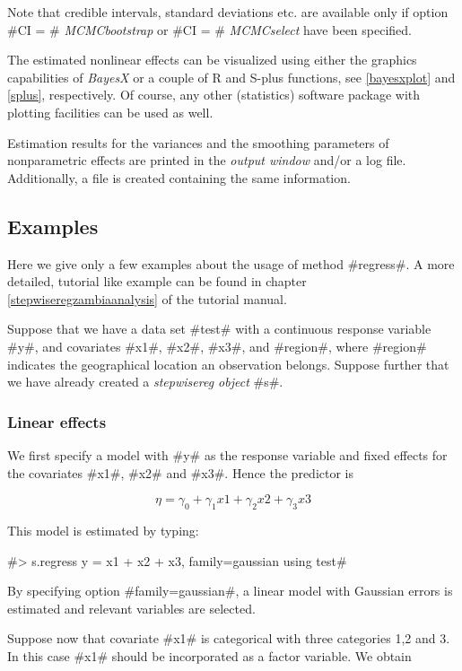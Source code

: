 Note that credible intervals, standard deviations etc. are available only
if option #CI = # {\em MCMCbootstrap} or
#CI = # {\em MCMCselect} have been specified.

The estimated nonlinear effects can be visualized using either the
graphics capabilities of {\em BayesX} or a couple of R and S-plus
functions,  see \autoref{bayesxplot} and \autoref{splus},
respectively. Of course, any other (statistics) software package
with plotting facilities can be used as well.

Estimation results for the variances and the smoothing parameters
of nonparametric effects are printed in the {\em output window}
and/or a log file. Additionally, a file is created containing the
same information.


\subsection{Examples}

Here we give only a few examples about the usage of method
#regress#. A more detailed, tutorial like example can be found in
chapter \ref*{stepwiseregzambiaanalysis} of the tutorial manual.

Suppose that we have a data set #test# with a continuous response
variable #y#, and covariates #x1#, #x2#, #x3#, and #region#,
where #region# indicates the geographical location an observation belongs. Suppose further that we have already created a
{\em stepwisereg object} #s#.

\subsubsection*{Linear effects}

We first specify a model with #y# as the response variable and
fixed effects for the covariates #x1#, #x2# and #x3#. Hence the
predictor is

$$
\eta = \gamma_0 + \gamma_1 x1 + \gamma_2 x2 + \gamma_3 x3
$$

This model is estimated by typing:

#> s.regress y = x1 + x2 + x3, family=gaussian using test#

By specifying option #family=gaussian#, a linear model with Gaussian errors is
estimated and relevant variables are selected.

Suppose now that covariate #x1# is categorical with three categories 1,2 and 3. In this case #x1# should be incorporated as a factor variable. We obtain


